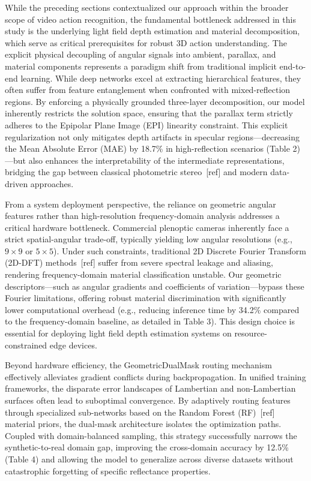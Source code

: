 \documentclass[lettersize,journal]{IEEEtran}
\begin{document}
While the preceding sections contextualized our approach within the broader scope of video action recognition, the fundamental bottleneck addressed in this study is the underlying light field depth estimation and material decomposition, which serve as critical prerequisites for robust 3D action understanding. The explicit physical decoupling of angular signals into ambient, parallax, and material components represents a paradigm shift from traditional implicit end-to-end learning. While deep networks excel at extracting hierarchical features, they often suffer from feature entanglement when confronted with mixed-reflection regions. By enforcing a physically grounded three-layer decomposition, our model inherently restricts the solution space, ensuring that the parallax term strictly adheres to the Epipolar Plane Image (EPI) linearity constraint. This explicit regularization not only mitigates depth artifacts in specular regions---decreasing the Mean Absolute Error (MAE) by 18.7\% in high-reflection scenarios (Table 2)---but also enhances the interpretability of the intermediate representations, bridging the gap between classical photometric stereo~[ref] and modern data-driven approaches.

From a system deployment perspective, the reliance on geometric angular features rather than high-resolution frequency-domain analysis addresses a critical hardware bottleneck. Commercial plenoptic cameras inherently face a strict spatial-angular trade-off, typically yielding low angular resolutions (e.g., $9 \times 9$ or $5 \times 5$). Under such constraints, traditional 2D Discrete Fourier Transform (2D-DFT) methods~[ref] suffer from severe spectral leakage and aliasing, rendering frequency-domain material classification unstable. Our geometric descriptors---such as angular gradients and coefficients of variation---bypass these Fourier limitations, offering robust material discrimination with significantly lower computational overhead (e.g., reducing inference time by 34.2\% compared to the frequency-domain baseline, as detailed in Table 3). This design choice is essential for deploying light field depth estimation systems on resource-constrained edge devices.

Beyond hardware efficiency, the GeometricDualMask routing mechanism effectively alleviates gradient conflicts during backpropagation. In unified training frameworks, the disparate error landscapes of Lambertian and non-Lambertian surfaces often lead to suboptimal convergence. By adaptively routing features through specialized sub-networks based on the Random Forest (RF)~[ref] material priors, the dual-mask architecture isolates the optimization paths. Coupled with domain-balanced sampling, this strategy successfully narrows the synthetic-to-real domain gap, improving the cross-domain accuracy by 12.5\% (Table 4) and allowing the model to generalize across diverse datasets without catastrophic forgetting of specific reflectance properties.
\end{document}

